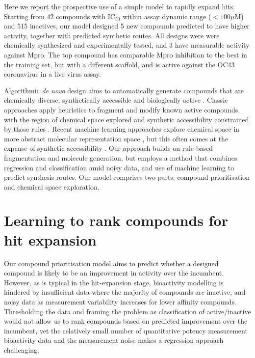Here we report the prospective use of a simple model to rapidly expand hits. Starting from 42 compounds with $\mathrm{IC}_{50}$ within assay dynamic range ($<100 \mu$M) and 515 inactives, our model designed 5 new compounds predicted to have higher activity, together with predicted synthetic routes. All designs were were chemically synthesized and experimentally tested, and 3 have measurable activity against Mpro. The top compound has comparable Mpro inhibition to the best in the training set, but with a different scaffold, and is active against the OC43 coronavirus in a live virus assay.

Algorithmic \emph{de novo} design aims to automatically generate compounds that are chemically diverse, synthetically accessible and biologically active \cite{schneider2016novo}. Classic approaches apply heuristics to fragment and modify known active compounds, with the region of chemical space explored and synthetic accessibility constrained by those rules \cite{brown2004graph,patel2009knowledge,hartenfeller2012dogs}. Recent machine learning approaches explore chemical space in more abstract molecular representation space \cite{gomez2018automatic,segler2018generating}, but this often comes at the expense of synthetic accessibility \cite{Gao2020Synthesizability}. Our approach builds on rule-based fragmentation and molecule generation, but employs a method that combines regression and classification amid noisy data, and use of machine learning to predict synthesis routes. Our model comprises two parts: compound prioritisation and chemical space exploration. 

\section{Learning to rank compounds for hit expansion}
Our compound prioritisation model aims to predict whether a designed compound is likely to be an improvement in activity over the incumbent. However, as is typical in the hit-expansion stage, bioactivity modelling is hindered by insufficient data where the majority of compounds are inactive, and noisy data as measurement variability increases for lower affinity compounds. Thresholding the data and framing the problem as classification of active/inactive would not allow us to rank compounds based on predicted improvement over the incumbent, yet the relatively small number of quantitative potency measurement bioactivity data and the measurement noise makes a regression approach challenging.

